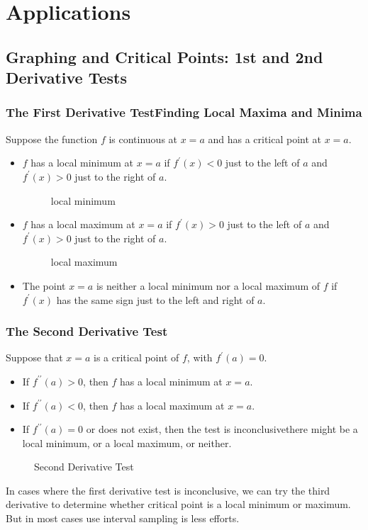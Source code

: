 \chapter{Applications}
\section{Graphing and Critical Points: 1st and 2nd Derivative Tests}
\subsection{The First Derivative Test\textemdash Finding Local Maxima and Minima}
Suppose the function $f$ is continuous at $x=a$ and has a critical point at $x=a$.
\begin{itemize}
\item $f$ has a local minimum at $x=a$ if $f^\prime(x)<0$ just to the left of $a$ and $f^\prime(x)>0$ just to the right of $a$.
  \begin{figure}[H]
    \centering
    \caption{local minimum}
  \end{figure}
\item $f$ has a local maximum at $x=a$ if $f^\prime (x)>0$ just to the left of $a$ and $f^\prime (x)>0$ just to the right of $a$.
  \begin{figure}[H]
    \centering
    \caption{local maximum}
  \end{figure}
\item The point $x=a$ is neither a local minimum nor a local maximum of $f$ if $f^\prime (x)$ has the same sign just to the left and right of $a$.
\end{itemize}

\subsection{The Second Derivative Test}
Suppose that $x=a$ is a critical point of $f$, with $f^\prime(a)=0$.
\begin{itemize}
\item If $f^{\prime\prime}(a)>0$, then $f$ has a local minimum at $x=a$.
\item If $f^{\prime\prime}(a)<0$, then $f$ has a local maximum at $x=a$.
\item If $f^{\prime\prime}(a)=0$ or does not exist, then the test is inconclusive\textemdash there might be a local minimum, or a local maximum, or neither.
\end{itemize}
\begin{figure}[H]
  \centering
  \caption{Second Derivative Test}
\end{figure}
\begin{note}
  In cases where the first derivative test is inconclusive, we can try the third derivative to determine whether critical point is a local minimum or maximum. But in most cases use interval sampling is less efforts.
\end{note}
